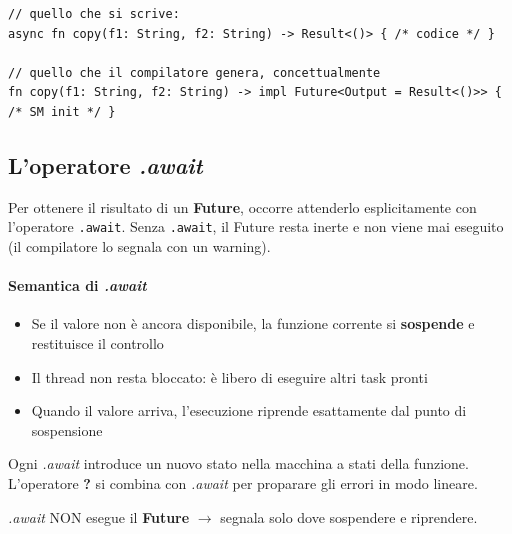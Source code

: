 \begin{verbatim}
// quello che si scrive:
async fn copy(f1: String, f2: String) -> Result<()> { /* codice */ }

// quello che il compilatore genera, concettualmente
fn copy(f1: String, f2: String) -> impl Future<Output = Result<()>> { /* SM init */ }
\end{verbatim}


\subsection{L'operatore \textit{.await}}

Per ottenere il risultato di un \textbf{Future}, occorre attenderlo
esplicitamente con l'operatore \verb|.await|.
Senza \verb|.await|, il Future resta inerte e non viene mai eseguito (il compilatore lo
segnala con un warning).



\paragraph{Semantica di \textit{.await}}

\begin{itemize}
  \item Se il valore non è ancora disponibile, la funzione corrente si \textbf{sospende} e restituisce il controllo
  \item Il thread non resta bloccato: è libero di eseguire altri task pronti
  \item Quando il valore arriva, l'esecuzione riprende esattamente dal punto di sospensione
\end{itemize}

Ogni \textit{.await} introduce un nuovo stato nella macchina a stati della funzione.
L'operatore \textbf{?} si combina con \textit{.await} per proparare gli errori in modo lineare.


\textit{.await} NON esegue il \textbf{Future} $\to$ segnala solo dove sospendere e riprendere.





